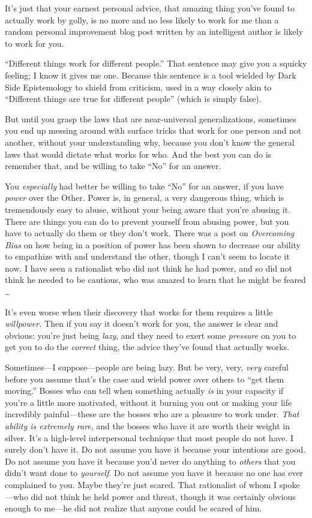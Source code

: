 {
 It's just that your earnest personal advice, that
amazing thing you've found to actually work by golly,
is no more and no less likely to work for me than a random personal
improvement blog post written by an intelligent author is likely to
work for you.}

{
 ``Different things work for different
people.'' That sentence may give you a squicky
feeling; I know it gives me one. Because this sentence is a tool
wielded by Dark Side Epistemology to shield from criticism, used in a
way closely akin to ``Different things are true for
different people'' (which is simply false).}

{
 But until you grasp the laws that are near-universal
generalizations, sometimes you end up messing around with surface
tricks that work for one person and not another, without your
understanding why, because you don't know the general
laws that would dictate what works for who. And the best you can do is
remember that, and be willing to take
``No'' for an answer.}

{
 You \textit{especially} had better be willing to take
``No'' for an answer, if you have
\textit{power} over the Other. Power is, in general, a very dangerous
thing, which is tremendously easy to abuse, without your being aware
that you're abusing it. There are things you can do to
prevent yourself from abusing power, but you have to actually do them
or they don't work. There was a post on
\textit{Overcoming Bias} on how being in a position of power has been
shown to decrease our ability to empathize with and understand the
other, though I can't seem to locate it now. I have
seen a rationalist who did not think he had power, and so did not think
he needed to be cautious, who was amazed to learn that he might be
feared \ldots}

{
 It's even worse when their discovery that works
for them requires a little \textit{willpower.} Then if you say it
doesn't work for you, the answer is clear and obvious:
you're just being \textit{lazy}, and they need to exert
some \textit{pressure} on you to get you to do the \textit{correct}
thing, the advice they've found that actually works.}

{
 Sometimes---I suppose---people are being lazy. But be very, very,
\textit{very} careful before you assume that's the case
and wield power over others to ``get them
moving.'' Bosses who can tell when something actually
\textit{is} in your capacity if you're a little more
motivated, without it burning you out or making your life incredibly
painful---these are the bosses who are a pleasure to work under.
\textit{That ability is extremely rare}, and the bosses who have it are
worth their weight in silver. It's a high-level
interpersonal technique that most people do not have. I surely
don't have it. Do not assume you have it because your
intentions are good. Do not assume you have it because
you'd never do anything to \textit{others} that you
didn't want done to \textit{yourself}. Do not assume
you have it because no one has ever complained to you. Maybe
they're just scared. That rationalist of whom I
spoke---who did not think he held power and threat, though it was
certainly obvious enough to me---he did not realize that anyone could
be scared of him.}

